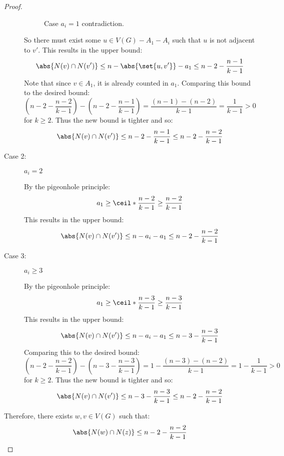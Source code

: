 \begin{proof}
\begin{description}
    \begin{figure}[H]
      \centering
      \caption{Case \(a_i=1\) contradiction.}
      \label{fig:aione}
    \end{figure}

    So there must exist some \(u\in V(G)-A_1-A_i\) such that \(u\) is not adjacent to \(v'\).  This results in the
    upper bound:
    \[\abs{N(v)\cap N(v')}\le n-\abs{\set{u,v'}}-a_1\le n-2-\frac{n-1}{k-1}\]
    Note that since \(v\in A_1\), it is already counted in \(a_1\).  Comparing this bound to the desired bound:
    \[\left(n-2-\frac{n-2}{k-1}\right)-\left(n-2-\frac{n-1}{k-1}\right)=\frac{(n-1)-(n-2)}{k-1}=\frac{1}{k-1}>0\]
    for \(k\ge2\).  Thus the new bound is tighter and so:
    \[\abs{N(v)\cap N(v')}\le n-2-\frac{n-1}{k-1}\le n-2-\frac{n-2}{k-1}\]
    
  \item [Case 2:] \(a_i=2\)

    By the pigeonhole principle:
    \[a_1\ge\ceil*{\frac{n-2}{k-1}}\ge\frac{n-2}{k-1}\]
    This results in the upper bound:
    \[\abs{N(v)\cap N(v')}\le n-a_i-a_1\le n-2-\frac{n-2}{k-1}\]
    
  \item [Case 3:] \(a_i\ge3\)

    By the pigeonhole principle:
    \[a_1\ge\ceil*{\frac{n-3}{k-1}}\ge\frac{n-3}{k-1}\]
    This results in the upper bound:
    \[\abs{N(v)\cap N(v')}\le n-a_i-a_1\le n-3-\frac{n-3}{k-1}\]
    Comparing this to the desired bound:
    \[\left(n-2-\frac{n-2}{k-1}\right)-\left(n-3-\frac{n-3}{k-1}\right)=1-\frac{(n-3)-(n-2)}{k-1}=1-\frac{1}{k-1}>0\]
    for \(k\ge2\).  Thus the new bound is tighter and so:
    \[\abs{N(v)\cap N(v')}\le n-3-\frac{n-3}{k-1}\le n-2-\frac{n-2}{k-1}\]
  \end{description}

  Therefore, there exists \(w,v\in V(G)\) such that:
  \[\abs{N(w)\cap N(z)}\le n-2-\frac{n-2}{k-1}\]
\end{proof}

